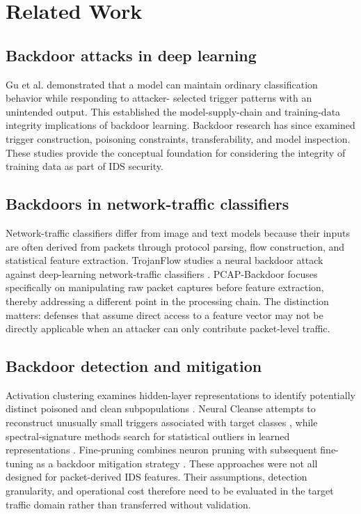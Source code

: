 \documentclass[11pt]{article}
\begin{document}
\section{Related Work}
\subsection{Backdoor attacks in deep learning}
Gu et al. \cite{ref3} demonstrated that a model can maintain ordinary classification behavior while responding to attacker- selected trigger patterns with an unintended output. This established the model-supply-chain and training-data integrity implications of backdoor learning. Backdoor research has since examined trigger construction, poisoning constraints, transferability, and model inspection. These studies provide the conceptual foundation for considering the integrity of training data as part of IDS security.

\subsection{Backdoors in network-traffic classifiers}
Network-traffic classifiers differ from image and text models because their inputs are often derived from packets through protocol parsing, flow construction, and statistical feature extraction. TrojanFlow studies a neural backdoor attack against deep-learning network-traffic classifiers \cite{ref9}. PCAP-Backdoor \cite{ref1} focuses specifically on manipulating raw packet captures before feature extraction, thereby addressing a different point in the processing chain. The distinction matters: defenses that assume direct access to a feature vector may not be directly applicable when an attacker can only contribute packet-level traffic.

\subsection{Backdoor detection and mitigation}
Activation clustering examines hidden-layer representations to identify potentially distinct poisoned and clean subpopulations \cite{ref4}. Neural Cleanse attempts to reconstruct unusually small triggers associated with target classes \cite{ref5}, while spectral-signature methods search for statistical outliers in learned representations \cite{ref6}. Fine-pruning combines neuron pruning with subsequent fine-tuning as a backdoor mitigation strategy \cite{ref7}. These approaches were not all designed for packet-derived IDS features. Their assumptions, detection granularity, and operational cost therefore need to be evaluated in the target traffic domain rather than transferred without validation.
\end{document}
